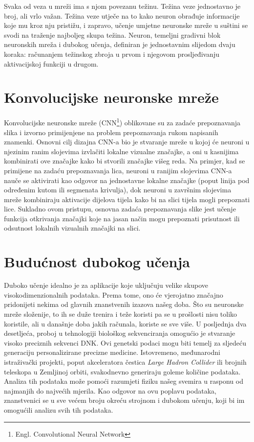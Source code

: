 \documentclass[times, utf8, diplomski]{fer}
\begin{document}
Svaka od veza u mreži ima s njom povezanu težinu. Težina veze jednostavno je broj, ali vrlo važan. Težina veze utječe na to kako neuron obrađuje informacije koje mu kroz nju pristižu, i zapravo, učenje umjetne neuronske mreže u suštini se svodi na traženje najboljeg skupa težina. Neuron, temeljni gradivni blok neuronskih mreža i dubokog učenja, definiran je jednostavnim slijedom dvaju koraka: računanjem težinskog zbroja u prvom i njegovom prosljeđivanju aktivacijskoj funkciji u drugom. \cite{knjiga}

\section{Konvolucijske neuronske mreže}
Konvolucijske neuronske mreže (CNN\footnote{Engl. Convolutional Neural Network}) oblikovane su za zadaće prepoznavanja slika i izvorno primijenjene na problem prepoznavanja rukom napisanih znamenki. Osnovni cilj dizajna CNN-a bio je stvaranje mreže u kojoj će neuroni u njezinim ranim slojevima izvlačiti lokalne vizualne značajke, a oni u kasnijima kombinirati ove značajke kako bi stvorili značajke višeg reda. Na primjer, kad se primijene na zadaću prepoznavanja lica, neuroni u ranijim slojevima CNN-a nauče se aktivirati kao odgovor na jednostavne lokalne značajke (poput linija pod određenim kutom ili segmenata krivulja), dok neuroni u završnim slojevima mreže kombiniraju aktivacije dijelova tijela kako bi na slici tijela mogli prepoznati lice. Sukladno ovom pristupu, osnovna zadaća prepoznavanja slike jest učenje funkcija otkrivanja značajki koje na jasan način mogu prepoznati prisutnost ili odsutnost lokalnih vizualnih značajki na slici. \cite{knjiga}

\section{Budućnost dubokog učenja}
Duboko učenje idealno je za aplikacije koje uključuju velike skupove visokodimenzionalnih podataka. Prema tome, ono će vjerojatno značajno pridonijeti nekima od glavnih znanstvenih izazova našeg doba. Što su neuronske mreže složenije, to ih se duže trenira i teže koristi pa se u prošlosti nisu toliko koristile, ali u današnje doba jakih računala, koriste se sve više. U posljednja dva desetljeća, proboj u tehnologiji biološkog sekvenciranja omogućio je stvaranje visoko preciznih sekvenci DNK. Ovi genetski podaci mogu biti temelj za sljedeću generaciju personalizirane precizne medicine. Istovremeno, međunarodni istraživački projekti, poput akceleratora čestica \textit{Large Hadron Collider} ili brojnih teleskopa u Zemljinoj orbiti, svakodnevno generiraju goleme količine podataka. Analiza tih podataka može pomoći razumjeti fiziku našeg svemira u rasponu od najmanjih do najvećih mjerila. Kao odgovor na ovu poplavu podataka, znanstvenici se u sve većem broju okreću strojnom i dubokom učenju, koji bi im omogućili analizu svih tih podataka. \cite{knjiga}
\end{document}
